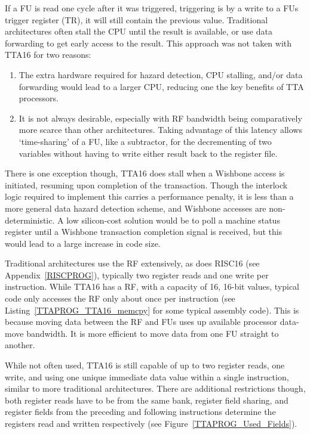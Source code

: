 If a FU is read one cycle after it was triggered, triggering is by a write to a
FUs trigger register (TR), it will still contain the previous value. Traditional
architectures often stall the CPU until the result is available, or use data
forwarding to get early access to the result. This approach was not taken with
TTA16 for two reasons:
\begin{enumerate}
  \item The extra hardware required for hazard detection, CPU stalling,
  and/or data forwarding would lead to a larger CPU, reducing one the key
  benefits of TTA processors.
  \item It is not always desirable, especially with RF bandwidth being
  comparatively more scarce than other architectures. Taking advantage of this
  latency allows `time-sharing' of a FU, like a subtractor, for the decrementing
  of two variables without having to write either result back to the register
  file.
\end{enumerate}

There is one exception though, TTA16 does stall when a Wishbone access is
initiated, resuming upon completion of the transaction. Though the interlock
logic required to implement this carries a performance penalty, it is less than
a more general data hazard detection scheme, and Wishbone accesses are
non-deterministic. A low silicon-cost solution would be to poll a machine
status register until a Wishbone transaction completion signal is received, but
this would lead to a large increase in code size.

Traditional architectures use the RF extensively, as does RISC16 (see
Appendix~\ref{RISCPROG}), typically two register reads and one write per
instruction. While TTA16 has a RF, with a capacity of 16, 16-bit values, typical
code only accesses the RF only about once per instruction (see
Listing~\ref{TTAPROG_TTA16_memcpy} for some typical assembly code). This is
because moving data between the RF and FUs uses up available processor data-move
bandwidth. It is more efficient to move data from one FU straight to another.

While not often used, TTA16 is still capable of up to two register reads, one
write, and using one unique immediate data value within a single instruction,
similar to more traditional architectures. There are additional restrictions
though, both register reads have to be from the same bank, register field
sharing, and register fields from the preceding and following instructions
determine the registers read and written respectively (see
Figure~\ref{TTAPROG_Used_Fields}).

